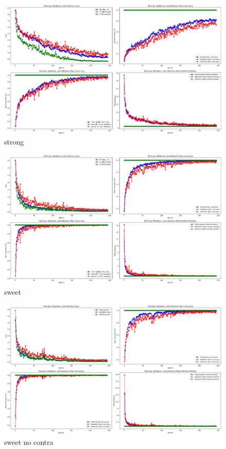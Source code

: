 \begin{figure}[H]
  \centering
  \includegraphics[scale=0.3]{figures/strong.png} 
  \caption{strong}
  \label{fig:strong_64}
\end{figure}

\begin{figure}[H]
  \centering
  \includegraphics[scale=0.3]{figures/sweet_bs64.png} 
  \caption{sweet}
  \label{fig:sweet_bs64}
\end{figure}

\begin{figure}[H]
  \centering
  \includegraphics[scale=0.3]{figures/sweet_no_contra.png} 
  \caption{sweet no contra}
  \label{fig:sweet_no_contra}
\end{figure}

